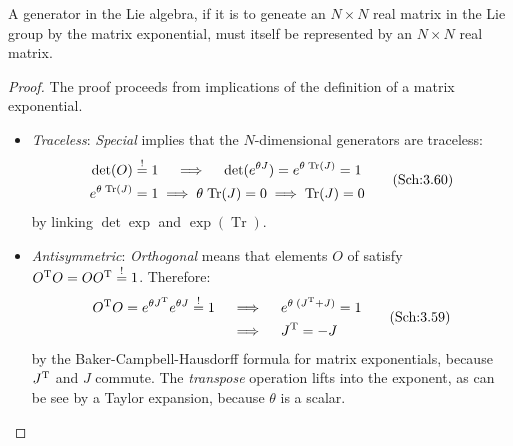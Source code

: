 \begin{remark}
    A generator in the Lie algebra, if it is to geneate an $N\times{}N$ real matrix in the Lie group by the
    matrix exponential, must itself be represented by an $N\times{}N$ real matrix.
\end{remark}

\begin{proof}
    The proof proceeds from implications of the definition of a matrix exponential.
\leavevmode
\begin{itemize}[noitemsep] %
    \item \textit{Traceless}:
        \textit{Special} implies that the $N$\nobreakdash-dimensional
        generators are traceless:
        \begin{equation}
            \begin{split}
                \det{O}\mustbe{1}&\quad\implies\quad\det{e^{\theta{}J}}=e^{\theta\;\trace{J}}=1 \\
                e^{\theta\;\trace{J}}=1&\implies\theta\;\trace{J}=0\implies\trace{J}=0
            \end{split}
            \tag{Sch:3.60}
        \end{equation}
        \noindent by  linking $\det{\exp}$ and 
        $\exp{(\operatorname{Tr})}$.\cite{horn2012matrix}
    \item \textit{Antisymmetric}: 
        \textit{Orthogonal} means that elements $O$ of  satisfy 
        $O^{\mathrm{T}}O=OO^{\mathrm{T}}\mathrel{\stackrel{!}{=}}{1}$. Therefore:
        \begin{equation}
            \begin{split}
            {\ensuremath{O^{\mathrm{T}}}}O=e^{\theta J^{\mathrm{T}}}
                               e^{\theta{}J}\mathrel{\stackrel{!}{=}}{}1
                               &\quad\implies\quad
                           e^{\theta\;(J^{\mathrm{T}}+J)}=1\\
                       &\quad\implies\quad 
                       J^{\mathrm{T}}=-J
            \end{split}
        \tag{Sch:3.59}
    \end{equation}
    \noindent by the Baker-Campbell-Hausdorff formula\cite{hall2015lie} for matrix
    exponentials, because $J^{\mathrm{T}}$ and $J$ commute.
    The \textit{transpose} operation lifts into the exponent, as can be see by
    a Taylor expansion, because $\theta$ is a scalar.
\end{itemize}
\end{proof}

